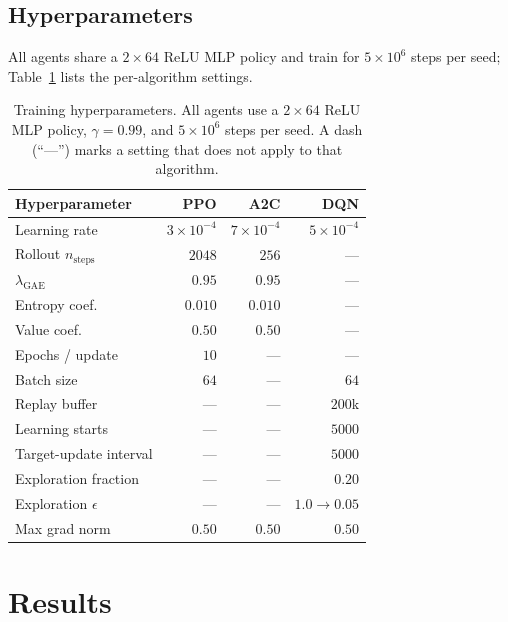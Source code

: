 \documentclass[3p,twocolumn]{elsarticle}
\begin{document}
\subsection{Hyperparameters}
\label{sec:hparams}
All agents share a $2\times64$ ReLU MLP policy and train for $5\times10^{6}$
steps per seed; Table~\ref{tab:hparams} lists the per-algorithm settings.

\begin{table}[tbp]
\centering
\caption{Training hyperparameters. All agents use a $2\times64$ ReLU MLP policy,
$\gamma=0.99$, and $5\times10^{6}$ steps per seed. A dash (``---'') marks a
setting that does not apply to that algorithm.}
\label{tab:hparams}
\scriptsize
\setlength{\tabcolsep}{5pt}
\renewcommand{\arraystretch}{0.95}
\begin{tabular}{@{}lrrr@{}}
\toprule
Hyperparameter & PPO & A2C & DQN \\
\midrule
Learning rate            & $3\times10^{-4}$ & $7\times10^{-4}$ & $5\times10^{-4}$ \\
Rollout $n_{\text{steps}}$ & $2048$ & $256$ & --- \\
$\lambda_{\text{GAE}}$   & $0.95$ & $0.95$ & --- \\
Entropy coef.            & $0.010$ & $0.010$ & --- \\
Value coef.              & $0.50$ & $0.50$ & --- \\
Epochs / update          & $10$ & --- & --- \\
Batch size               & $64$ & --- & $64$ \\
Replay buffer            & --- & --- & $200$k \\
Learning starts          & --- & --- & $5000$ \\
Target-update interval    & --- & --- & $5000$ \\
Exploration fraction     & --- & --- & $0.20$ \\
Exploration $\epsilon$   & --- & --- & $1.0\!\to\!0.05$ \\
Max grad norm            & $0.50$ & $0.50$ & $0.50$ \\
\bottomrule
\end{tabular}
\end{table}

\section{Results}
\label{sec:results}
\end{document}
